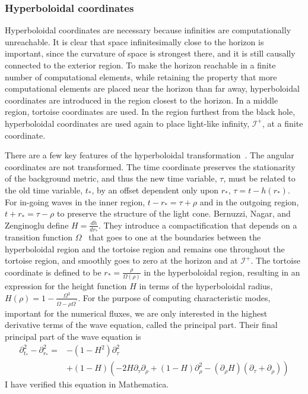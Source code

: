 \subsubsection{Hyperboloidal coordinates}  
Hyperboloidal coordinates are necessary because infinities are computationally unreachable. It is clear that space infinitesimally close to the horizon is important, since the curvature of space is strongest there, and it is still causally connected to the exterior region. To make the horizon reachable in a finite number of computational elements, while retaining the property that more computational elements are placed near the horizon than far away, hyperboloidal coordinates are introduced in the region closest to the horizon. In a middle region, tortoise coordinates are used. In the region furthest from the black hole, hyperboloidal coordinates are used again to place light-like infinity, $\mathcal{I}^+$, at a finite coordinate. 



There are a few key features of the hyperboloidal transformation~\cite{bernuzzi_nagar_zenginoglu_hyperb}. The angular coordinates are not transformed. The time coordinate preserves the stationarity of the background metric, and thus the new time variable, $\tau$, must be related to the old time variable, $t_*$, by an offset dependent only upon $r_*$, $\tau=t-h(r_*)$. For in-going waves in the inner region, $t-r_*=\tau+\rho$ and in the outgoing region, $t+r_*=\tau-\rho$ to preserve the structure of the light cone. Bernuzzi, Nagar, and Zenginoglu define $H=\frac{dh}{dr_*}$. They introduce a compactification that depends on a transition function $\Omega$~\cite{OmegaTransferFunction} that goes to one at the boundaries between the hyperboloidal region and the tortoise region and remains one throughout the tortoise region, and smoothly goes to zero at the horizon and at $\mathcal{I}^+$. The tortoise coordinate is defined to be  $r_*=\frac{\rho}{\Omega(\rho)}$ in the hyperboloidal region, resulting in an expression for the height function $H$ in terms of the hyperboloidal radius,  $H(\rho)=1-\frac{\Omega^2}{\Omega-\rho\Omega^\prime}$. For the purpose of computing characteristic modes, important for the numerical fluxes, we are only interested in the highest derivative terms of the wave equation, called the principal part. Their final principal part of the wave equation is~\cite{bernuzzi_nagar_zenginoglu_hyperb}
  \begin{eqnarray}
    \partial_{t_*}^2-\partial_{r_*}^2=&-(1-H^2)\partial_\tau^2\nonumber\\
    &+(1-H)(-2H\partial_\tau\partial_\rho+(1-H)\partial_\rho^2-(\partial_\rho H)(\partial_\tau+\partial_\rho))
  \end{eqnarray}    
I have verified this equation in Mathematica.

